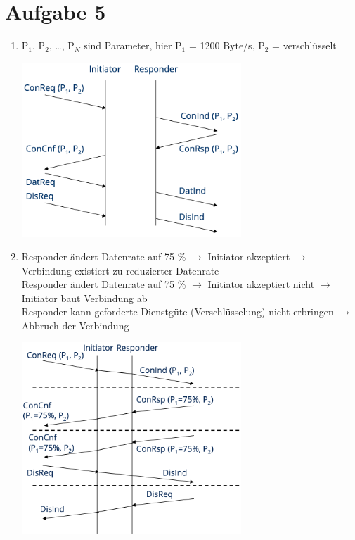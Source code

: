 \documentclass{article}
\begin{document}
	\section*{Aufgabe 5}
	\begin{enumerate}[label=(\alph*)]
		\item P$_1$, P$_2$, …, P$_N$ sind Parameter, hier P$_1$ = 1200 Byte/s, P$_2$ = verschlüsselt
		\begin{center}
			\includegraphics[width=0.65\textwidth]{./pics/QoS-1}
		\end{center}
		\item Responder ändert Datenrate auf 75 \% $\to$ Initiator akzeptiert $\to$ Verbindung existiert zu reduzierter Datenrate \\
		Responder ändert Datenrate auf 75 \% $\to$ Initiator akzeptiert nicht $\to$ Initiator baut Verbindung ab \\
		Responder kann geforderte Dienstgüte (Verschlüsselung) nicht erbringen $\to$ Abbruch der Verbindung
		\begin{center}
			\includegraphics[width=0.65\textwidth]{./pics/QoS-2}
		\end{center}
	\end{enumerate}
	
\end{document}
